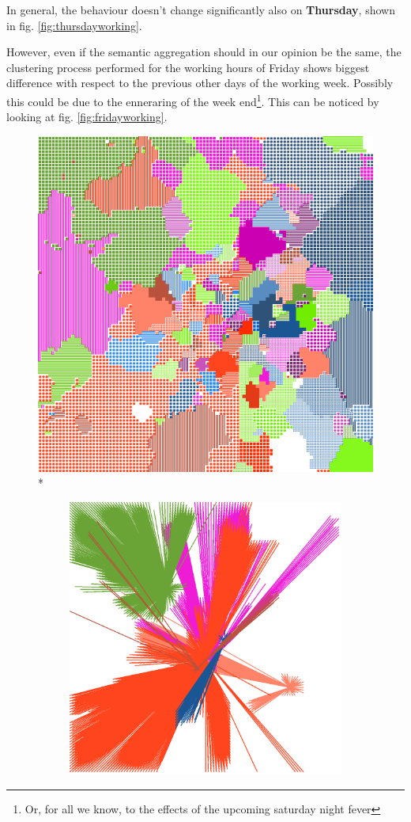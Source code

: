 \documentclass[12pt,a4paper]{article}
\begin{document}
In general, the behaviour doesn't change significantly also on \textbf{Thursday},
shown in fig. \ref{fig:thursdayworking}.

However, even if the semantic aggregation should in our opinion be the same, the clustering process performed for the working hours of Friday shows biggest difference with respect to the previous other days of the working week. Possibly this could be due to the enneraring of the week end\footnote{Or, for all we know, to the effects of the upcoming saturday night fever}. This can be noticed by looking at fig. \ref{fig:fridayworking}.

\begin{figure}[H]
\centering
\includegraphics[width=0.8\linewidth]{weekDef/4Thu.png}
\\*
\begin{subfigure}[b]{0.3\textwidth}
\includegraphics[width=\textwidth]{weekDef/edges-4Thu-big.png}

\end{subfigure}
\end{figure}
\end{document}
